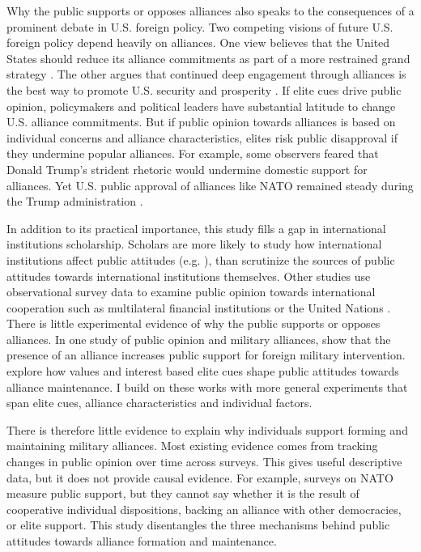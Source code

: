 \documentclass[12pt]{article}
\begin{document}
Why the public supports or opposes alliances also speaks to the consequences of a prominent debate in U.S. foreign policy. 
Two competing visions of future U.S. foreign policy depend heavily on alliances. 
One view believes that the United States should reduce its alliance commitments as part of a more restrained grand strategy \citep{Preble2009, Posen2014}.
The other argues that continued deep engagement through alliances is the best way to promote U.S. security and prosperity \citep{Brooksetal2013, BrandsFeaver2017}. 
If elite cues drive public opinion, policymakers and political leaders have substantial latitude to change U.S. alliance commitments. 
But if public opinion towards alliances is based on individual concerns and alliance characteristics, elites risk public disapproval if they undermine popular alliances.  
For example, some observers feared that Donald Trump's strident rhetoric would undermine domestic support for alliances.
Yet U.S. public approval of alliances like NATO remained steady during the Trump administration \citep{PewNATO2020}. 


In addition to its practical importance, this study fills a gap in international institutions scholarship. 
Scholars are more likely to study how international institutions affect public attitudes (e.g. \citep{KayaWalker2014, Greenhill2020}), than scrutinize the sources of public attitudes towards international institutions themselves. 
Other studies use observational survey data to examine public opinion towards international cooperation such as multilateral financial institutions \citep{Edwards2009} or the United Nations \citep{Torgler2008, DellmuthTallberg2015}. 
There is little experimental evidence of why the public supports or opposes alliances.
In one study of public opinion and military alliances, \citet{TomzWeeks2021} show that the presence of an alliance increases public support for foreign military intervention. 
\citet{Chuetal2021} explore how values and interest based elite cues shape public attitudes towards alliance maintenance. 
I build on these works with more general experiments that span elite cues, alliance characteristics and individual factors. 


There is therefore little evidence to explain why individuals support forming and maintaining military alliances. 
Most existing evidence comes from tracking changes in public opinion over time across surveys.
This gives useful descriptive data, but it does not provide causal evidence.
For example, surveys on NATO measure public support, but they cannot say whether it is the result of cooperative individual dispositions, backing an alliance with other democracies, or elite support. 
This study disentangles the three mechanisms behind public attitudes towards alliance formation and maintenance. 
\end{document}
